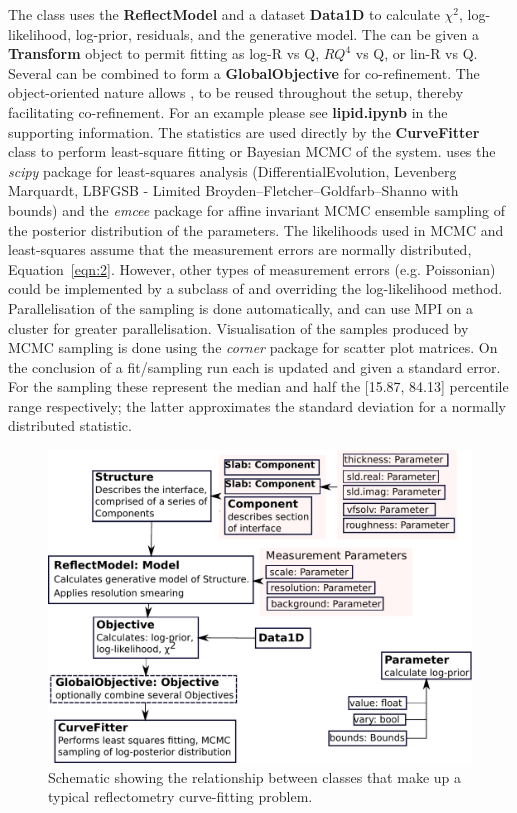 \documentclass[12pt]{article}
\begin{document}
The \Objective class uses the \textbf{ReflectModel} and a dataset \textbf{Data1D} to calculate $\chi^2$, log-likelihood, log-prior, residuals, and the generative model. The \Objective can be given a \textbf{Transform} object to permit fitting as log-R vs Q, $RQ^4$ vs Q, or lin-R vs Q. Several \Objective can be combined to form a \textbf{GlobalObjective} for co-refinement. The object-oriented nature allows \Parameter, \Component to be reused throughout the setup, thereby facilitating co-refinement. For an example please see \textbf{lipid.ipynb} in the supporting information.
The \Objective statistics are used directly by the \textbf{CurveFitter} class to perform least-square fitting or Bayesian MCMC of the system.  uses the \emph{scipy} package for least-squares analysis (DifferentialEvolution, Levenberg Marquardt, LBFGSB - Limited Broyden–Fletcher–Goldfarb–Shanno with bounds) and the  \emph{emcee} package \cite{emcee} for affine invariant MCMC ensemble sampling of the posterior distribution of the parameters. The likelihoods used in MCMC and least-squares assume that the measurement errors are normally distributed, Equation~\ref{eqn:2}. However, other types of measurement errors (e.g. Poissonian) could be implemented by a subclass of \Objective and overriding the log-likelihood method.
Parallelisation of the sampling is done automatically, and can use MPI on a cluster for greater parallelisation. Visualisation of the samples produced by MCMC sampling is done using the \emph{corner} package \cite{corner} for scatter plot matrices. On the conclusion of a fit/sampling run each \Parameter is updated and given a standard error. For the sampling these represent the median and half the [15.87, 84.13] percentile range respectively; the latter approximates the standard deviation for a normally distributed statistic.

\begin{figure}
  \includegraphics[width=\linewidth]{components}
  \caption{Schematic showing the relationship between classes that make up a typical reflectometry curve-fitting problem.}
  \label{fig:components}
\end{figure}
\end{document}
